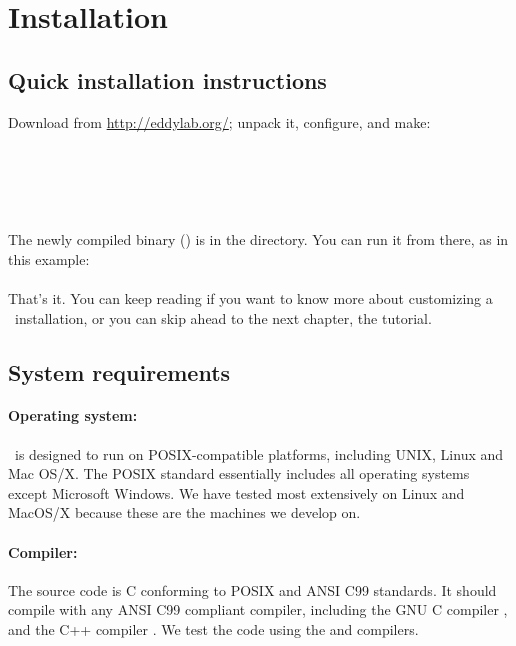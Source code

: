 \section{Installation}
\label{section:installation}
\setcounter{footnote}{0}

\subsection{Quick installation instructions}

Download  from \url{http://eddylab.org/}; unpack
it, configure, and make:\\

\\
\\
\\ 
\\
\\

The newly compiled binary (\prog{\rscape}) is in the
 directory. You can run it from there,
as in this example:\\

\\


That's it.  You can keep reading if you want to know more about
customizing a \rscape\ installation, or you can skip ahead to the next
chapter, the tutorial.


\subsection{System requirements}

\paragraph{Operating system:} \rscape\ is designed to run on
POSIX-compatible platforms, including UNIX, Linux and Mac OS/X. The
POSIX standard essentially includes all operating systems except
Microsoft Windows. We have tested most extensively on Linux and
MacOS/X because these are the machines we develop on.

\paragraph{Compiler:} The source code is C conforming to POSIX and ANSI
C99 standards. It should compile with any ANSI C99 compliant compiler,
including the GNU C compiler , and the C++ compiler
. We test the code using the  and 
compilers.

